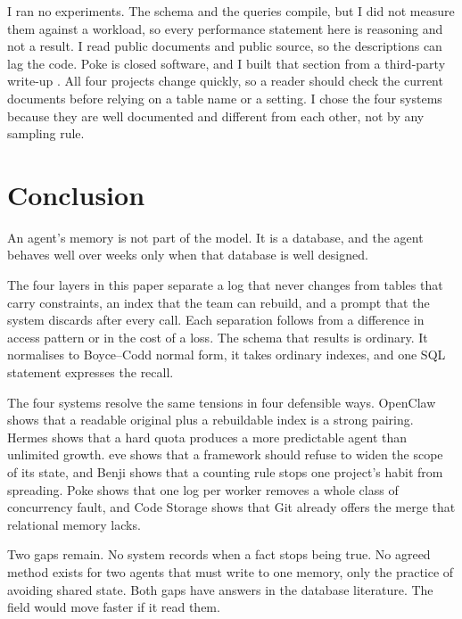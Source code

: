 \documentclass[11pt,a4paper]{article}
\begin{document}
I ran no experiments. The schema and the queries compile, but I did not
measure them against a workload, so every performance statement here is
reasoning and not a result. I read public documents and public source, so
the descriptions can lag the code. Poke is closed software, and I built
that section from a third-party write-up \cite{shlokedPoke}. All four
projects change quickly, so a reader should check the current documents
before relying on a table name or a setting. I chose the four systems
because they are well documented and different from each other, not by
any sampling rule.

\section{Conclusion}

An agent's memory is not part of the model. It is a database, and the
agent behaves well over weeks only when that database is well designed.

The four layers in this paper separate a log that never changes from
tables that carry constraints, an index that the team can rebuild, and a
prompt that the system discards after every call. Each separation follows
from a difference in access pattern or in the cost of a loss. The schema
that results is ordinary. It normalises to Boyce--Codd normal form, it
takes ordinary indexes, and one SQL statement expresses the recall.

The four systems resolve the same tensions in four defensible ways.
OpenClaw shows that a readable original plus a rebuildable index is a
strong pairing. Hermes shows that a hard quota produces a more
predictable agent than unlimited growth. eve shows that a framework
should refuse to widen the scope of its state, and Benji shows that a
counting rule stops one project's habit from spreading. Poke shows that
one log per worker removes a whole class of concurrency fault, and Code
Storage shows that Git already offers the merge that relational memory
lacks.

Two gaps remain. No system records when a fact stops being true. No
agreed method exists for two agents that must write to one memory, only
the practice of avoiding shared state. Both gaps have answers in the
database literature. The field would move faster if it read them.
\end{document}
